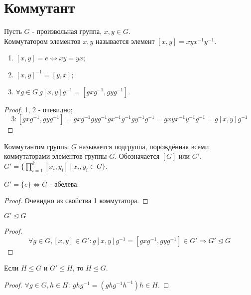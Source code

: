 \section{Коммутант}
\begin{definition}
    Пусть $G$ - произвольная группа, $x, y \in G$.\\
    Коммутатором элементов $x, y$ называется элемент $[x, y] = xyx^{-1}y^{-1}$. 
\end{definition}
\begin{properties}\tab
    \begin{enumerate}
        \item $[x, y] = e \Longleftrightarrow xy = yx$;
        \item $[x, y]^{-1} = [y, x]$;
        \item $\forall g \in G \ g[x, y]g^{-1} = [gxg^{-1}, gyg^{-1}]$.
    \end{enumerate}    
\end{properties}
\begin{proof}
    1, 2 - очевидно;
    \[3: [gxg^{-1}, gyg^{-1}] = gxg^{-1}gyg^{-1}gx^{-1}g^{-1}gy^{-1}g^{-1} = gxyx^{-1}y^{-1}g^{-1} = g[x, y]g^{-1}\]
\end{proof}
\begin{definition}
    Коммутантом группы $G$ называется подгруппа, порождённая всеми коммутаторами элементов группы $G$. Обозначается $[G]$ или $G'$.\\
    $G' = \{\prod \limits_{i = 1}^k [x_i, y_i] \ | \ x_i, y_i \in G\}$.
\end{definition}
\begin{subtheorem}
    $G' = \{e\} \Longleftrightarrow G$ - абелева.
\end{subtheorem}
\begin{proof}
    Очевидно из свойства 1 коммутатора.
\end{proof}
\begin{subtheorem}
    $G' \unlhd G$
\end{subtheorem}
\begin{proof}
    \[\forall g \in G, [x, y] \in G': g[x, y]g^{-1} = [gxg^{-1}, gyg^{-1}] \in G' \Longrightarrow G' \unlhd G\]
\end{proof}
\begin{subtheorem}
    Если $H \leq G$ и $G' \leq H$, то $H \unlhd G$.
\end{subtheorem}
\begin{proof}
    $\forall g \in G, h \in H: \ ghg^{-1} = (ghg^{-1}h^{-1})h \in H$.
\end{proof}
